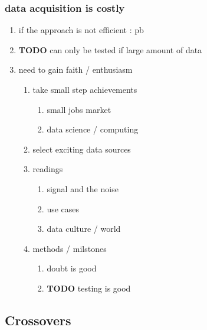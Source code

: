 \documentclass[11pt]{article}
\begin{document}
\subsubsection{data acquisition is costly}
\label{sec:org9c9969b}
\begin{enumerate}
\item if the approach is not efficient : pb
\label{sec:org780e2b0}
\item {\bfseries\sffamily TODO} can only be tested if large amount of data
\label{sec:orgc3fff22}
\item need to gain faith / enthusiasm
\label{sec:org247a4e2}
\begin{enumerate}
\item take small step achievements
\label{sec:org17ffbac}
\begin{enumerate}
\item small jobs market
\label{sec:org09a2e0c}
\item data science / computing
\label{sec:org024ea55}
\end{enumerate}
\item select exciting data sources
\label{sec:org5c24110}
\item readings
\label{sec:org1f4aab6}
\begin{enumerate}
\item signal and the noise
\label{sec:orgb5e81d0}
\item use cases
\label{sec:org48fe830}
\item data culture / world
\label{sec:org440ea51}
\end{enumerate}
\item methods / milstones
\label{sec:org3d764f4}
\begin{enumerate}
\item doubt is good
\label{sec:org50d8426}
\item {\bfseries\sffamily TODO} testing is good
\label{sec:org4509184}
\end{enumerate}
\end{enumerate}
\end{enumerate}
\subsection{Crossovers}
\label{sec:org28f966f}
\end{document}
